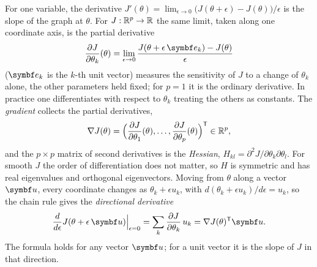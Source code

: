 \documentclass[11pt]{article}
\newcommand{\evec}{\vect{e}}
\newcommand{\uvec}{\vect{u}}
\begin{document}
For one variable, the derivative $J'(\theta) = \lim_{\epsilon\to 0}\big(J(\theta + \epsilon) - J(\theta)\big)/\epsilon$ is
the slope of the graph at $\theta$. For $J : \mathbb{R}^p \to \mathbb{R}$ the same limit, taken along one coordinate axis, is the partial derivative
\[
  \frac{\partial J}{\partial\theta_k}(\theta) = \lim_{\epsilon\to 0} \frac{J(\theta + \epsilon\,\evec_k) - J(\theta)}{\epsilon}
\]
($\evec_k$ is the $k$-th unit vector) measures the sensitivity of $J$ to a change of $\theta_k$ alone, the other
parameters held fixed; for $p = 1$ it is the ordinary derivative. In practice one differentiates with respect to $\theta_k$ treating the others as constants.
The \emph{gradient} collects the partial derivatives,
\[
  \nabla J(\theta) = \Big( \frac{\partial J}{\partial\theta_1}(\theta), \dots, \frac{\partial J}{\partial\theta_p}(\theta) \Big)^{\mathsf{T}} \in \mathbb{R}^p ,
\]
and the $p \times p$ matrix of second derivatives is the \emph{Hessian}, $H_{kl} = \partial^2 J / \partial\theta_k\partial\theta_l$.
For smooth $J$ the order of differentiation does not matter, so $H$ is symmetric and has real eigenvalues and orthogonal
eigenvectors. Moving from $\theta$ along a vector $\uvec$, every coordinate changes as $\theta_k + \epsilon u_k$, with
$d(\theta_k + \epsilon u_k)/d\epsilon = u_k$, so the chain rule gives the \emph{directional derivative}
\begin{equation}\label{eq:directional}
  \frac{d}{d\epsilon} J(\theta + \epsilon\,\uvec)\Big|_{\epsilon = 0} = \sum_k \frac{\partial J}{\partial\theta_k}\,u_k = \nabla J(\theta)\T\uvec .
\end{equation}
The formula holds for any vector $\uvec$; for a unit vector it is the slope of $J$ in that direction.
\end{document}
